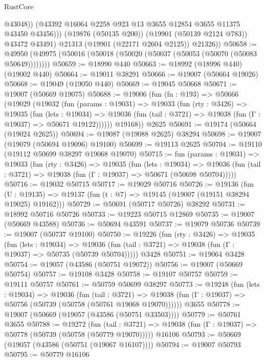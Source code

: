 \begin{lexlean}{RustCore}
\begin{coremodule}
                  @43048))
              (@43392 @16064 @2258 @923 @13 @3655 @12854 @3655 @11375 @43450 @43456)))
          (@19876 (@50135 @200))
          (@19901 (@50139 @2124 @783))
          @43472
          @43491)
        @21313
        (@19901 (@22171 @2604 @2125))
        @21326))
@50658 := @49950 (@49975 (@50016 (@50018 (@50020 (@50037 (@50053 (@50070 (@50083 @50649))))))))
@50659 := @18990 @440
@50663 := @18992 (@18996 @440) (@19002 @440)
@50664 := @19011 @38291
@50666 := @19007 (@50664 @19026)
@50668 := @19049 (@19050 @440)
@50669 := @19045 @50668
@50671 := @19007 (@50669 @19075)
@50688 := @19006
    (fun (fn : @193) =>
    @50666
      (@19029
        (@19032
          (fun (params : @19031) =>
          @19033
            (fun (rty : @3426) =>
            @19035
              (fun (lets : @19034) =>
              @19036 (fun (tail : @3721) => @19038 (fun (Γ : @19037) => @50671 @19122))))))
        @19168))
    @2625
@50691 := @19174 (@50664 (@19024 @2625))
@50694 := @19087 (@19088 @2625) @38294
@50698 := @19007 (@19079 (@50694 @19096) @19100)
@50699 := @19113 @2625
@50704 := @19110 (@19112 @50699 @38297 @19068 @19070)
@50715 := fun (params : @19031) =>
  @19033
    (fun (rty : @3426) =>
    @19035
      (fun (lets : @19034) =>
      @19036 (fun (tail : @3721) => @19038 (fun (Γ : @19037) => @50671 (@50698 @50704)))))
@50716 := @19032 @50715
@50717 := @19029 @50716
@50726 := @19136
    (fun (U : @19135) => @19137 (fun (t : @7) => @19145 (@19007 (@19151 @38294 @19025) @19162)))
@50729 := @50691 (@50717 @50726) @38292
@50731 := @18992 @50716 @50726
@50733 := @19223 @50715 @12869
@50735 := @19007 (@50669 @43588)
@50736 := @50694 @43591
@50737 := @19079 @50736
@50739 := @19007 (@50737 @19100)
@50750 := @19226
    (fun (rty : @3426) =>
    @19035
      (fun (lets : @19034) =>
      @19036 (fun (tail : @3721) => @19038 (fun (Γ : @19037) => @50735 (@50739 @50704)))))
    @3428
@50751 := @19064 @3428
@50754 := @19057 (@43586 (@50751 @19072))
@50756 := @19007 (@50669 @50754)
@50757 := @19108 @3428
@50758 := @19107 @50757
@50759 := @19111 @50757
@50761 := @50759 @50699 @38297
@50773 := @19248
    (fun (lets : @19034) =>
    @19036
      (fun (tail : @3721) =>
      @19038 (fun (Γ : @19037) => @50756 (@50739 (@50758 (@50761 @19068 @19070))))))
    @3655
@50778 := @19007 (@50669 (@19057 (@43586 (@50751 @33503))))
@50779 := @50761 @3655
@50788 := @19272
    (fun (tail : @3721) => @19038 (fun (Γ : @19037) => @50778 (@50739 (@50758 (@50779 @19070)))))
    @16106
@50793 := @50669 (@19057 (@43586 (@50751 (@19067 @16107))))
@50794 := @19007 @50793
@50795 := @50779 @16106

\end{coremodule}
\end{lexlean}
